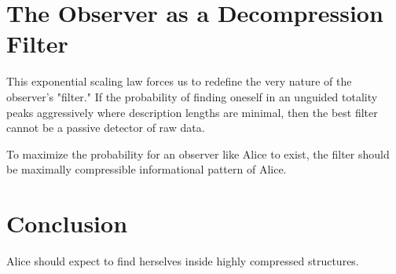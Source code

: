 \section{The Observer as a Decompression Filter}

This exponential scaling law forces us to redefine the very nature of the observer's "filter."
If the probability of finding oneself in an unguided totality peaks aggressively where description lengths are minimal, then the best filter cannot be a passive detector of raw data. 

To maximize the probability for an observer like Alice to exist, the filter should be maximally compressible informational
pattern of Alice.


\section{Conclusion}

Alice should expect to find herselves inside highly compressed structures.
